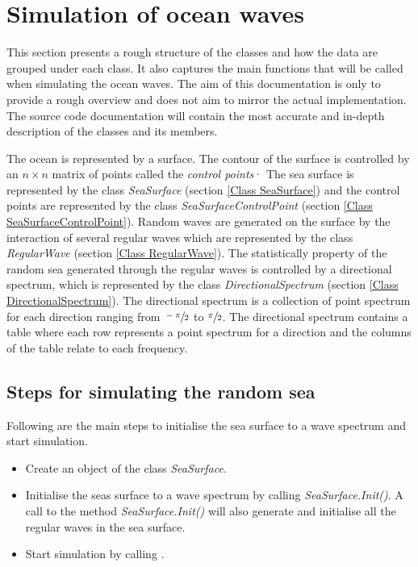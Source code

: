 \section{Simulation of ocean waves} \label{Simulation of ocean waves}

This section presents a rough structure of the classes and how the data are 
grouped under each class. It also captures the main functions that will be
called when simulating the ocean waves. The aim of this documentation is only to
provide a rough overview and does not aim to mirror the actual implementation. 
The source code documentation will contain the most accurate and in-depth 
description of the classes and its members. 

The ocean is represented by a surface. The contour of the surface is controlled
by an $n \times n$ matrix of points called the \textit{control points}· The sea
surface is represented by the class \textit{SeaSurface} (section 
\ref{Class SeaSurface}) and the control points are represented by the class
\textit{SeaSurfaceControlPoint} (section \ref{Class SeaSurfaceControlPoint}). 
Random waves are generated on the surface by the interaction of several regular 
waves which are represented by the class \textit{RegularWave} (section 
\ref{Class RegularWave}). The statistically property of the random sea generated 
through the regular waves is controlled by a directional spectrum, which is 
represented by the class \textit{DirectionalSpectrum} (section 
\ref{Class DirectionalSpectrum}). The directional spectrum is a collection of 
point spectrum for each direction ranging from $\sfrac{-\pi}{2}$ to 
$\sfrac{\pi}{2}$.  The directional spectrum contains a table where each row 
represents a point spectrum for a direction and the columns of the table relate 
to each frequency.

\subsection{Steps for simulating the random sea} 
Following are the main steps to initialise the sea surface to a wave spectrum
and start simulation.
\label{Process for simulating the random sea}
\begin{itemize}
  \item Create an object of the class \textit{SeaSurface}.
	\item Initialise the seas surface to a wave spectrum by calling 
    \textit{SeaSurface.Init()}. A call to the method \textit{SeaSurface.Init()} 
    will also generate and initialise all the regular waves in the sea surface.
  \item Start simulation by calling .
\end{itemize}

